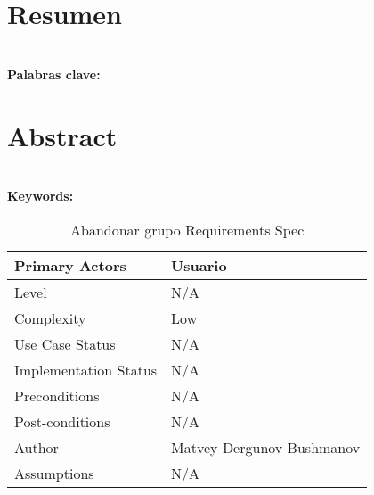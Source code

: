 \documentclass{book}
\begin{document}
\begingroup
\chapter{Resumen}
\lipsum[2-4]
\textbf{\\\large Palabras clave: }

\chapter{Abstract}
\lipsum[2-4]

\textbf{\\\large Keywords: }
\endgroup

\begin{table}[ht]
    \centering
    \begin{tabular}{|m{3cm}|m{10cm}|}
        \hline
        \rowcolor{blue!20} Primary Actors        & Usuario                   \\
        \hline
        Level                                    & N/A                       \\
        \hline
        \rowcolor{blue!20} Complexity            & Low                       \\
        \hline
        Use Case Status                          & N/A                       \\
        \hline
        \rowcolor{blue!20} Implementation Status & N/A                       \\
        \hline
        Preconditions                            & N/A                       \\
        \hline
        \rowcolor{blue!20} Post-conditions       & N/A                       \\
        \hline
        Author                                   & Matvey Dergunov Bushmanov \\
        \hline
        \rowcolor{blue!20} Assumptions           & N/A                       \\
        \hline
    \end{tabular}
    \caption{Abandonar grupo Requirements Spec}
\end{table}

\tableofcontents
\end{document}
